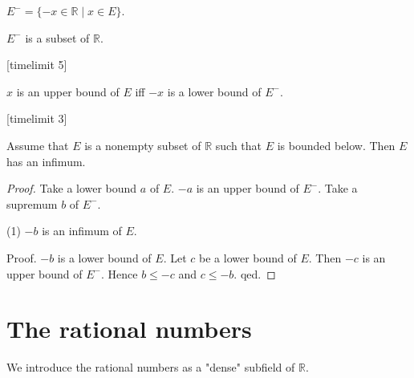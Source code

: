 \documentclass{article}
\begin{document}
\begin{forthel}
\begin{definition}
$E^- = \{-x \in \mathbb{R} \mid x \in E\}$.
\end{definition}

\begin{lemma}
$E^-$ is a subset of $\mathbb{R}$.
\end{lemma}
[timelimit 5]
\begin{lemma}
$x$ is an upper bound of $E$ iff $-x$ is a lower bound of $E^-$.
\end{lemma}
[timelimit 3]

\begin{theorem} Assume that $E$ is a nonempty subset of $\mathbb{R}$
such that $E$ is bounded below.
Then $E$ has an infimum.\end{theorem}
\begin{proof}
Take a lower bound $a$ of $E$.
$-a$ is an upper bound of $E^-$.
Take a supremum $b$ of $E^-$.

(1) $-b$ is an infimum of $E$.

Proof.
$-b$ is a lower bound of $E$. 
Let $c$ be a lower bound of $E$.
Then $-c$ is an upper bound of $E^-$.
Hence $b \leq -c$ and $c \leq -b$. 
qed.
\end{proof}
\end{forthel}


\section{The rational numbers}

We introduce the rational numbers
as a "dense" subfield of $\mathbb{R}$.
\end{document}
